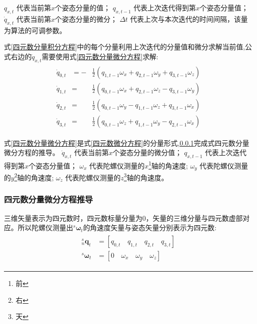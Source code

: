 $q_{x,t}$       代表当前第$x$个姿态分量的值；
$q_{x,t-1}$     代表上次迭代得到第$x$个姿态分量值；
$\dot{q}_{x,t}$ 代表当前第$x$个姿态分量的微分；
$\Delta t$      代表上次与本次迭代的时间间隔，该量为算法的可调参数。

式\ref{四元数分量积分方程}中的每个分量利用上次迭代的分量值和微分求解当前值,公式右边的$\dot{q}_{x,t}$需要使用式\ref{四元数分量微分方程}求解:
\begin{eqnarray}\label{四元数分量微分方程}
    \begin{split}
        \dot{q}_{0,t}&=- &\frac{1}{2}(q_{1,t-1}\omega_x+q_{2,t-1}\omega_y+q_{3,t-1}\omega_z) \\
        \dot{q}_{1,t}&=  &\frac{1}{2}(q_{0,t-1}\omega_x+q_{2,t-1}\omega_z-q_{3,t-1}\omega_y) \\
        \dot{q}_{2,t}&=  &\frac{1}{2}(q_{0,t-1}\omega_y-q_{1,t-1}\omega_z+q_{3,t-1}\omega_x) \\
        \dot{q}_{3,t}&=  &\frac{1}{2}(q_{0,t-1}\omega_z+q_{1,t-1}\omega_y-q_{2,t-1}\omega_x)
    \end{split}
\end{eqnarray} 

式\ref{四元数分量微分方程}是式\ref{四元数微分方程}的分量形式,\ref{section:四元数分量微分方程推导}完成式四元数分量微分方程的推导。
$\dot{q}_{x,t}$ 代表当前第$x$个姿态分量的微分值； 
$q_{x,t-1}$     代表上次迭代得到第$x$个姿态分量值；
$\omega_x$      代表陀螺仪测量的$x$\footnote{前}轴的角速度;
$\omega_y$      代表陀螺仪测量的$y$\footnote{右}轴的角速度;
$\omega_z$      代表陀螺仪测量的$z$\footnote{天}轴的角速度。

\subsubsection{四元数分量微分方程推导}\label{section:四元数分量微分方程推导}
三维矢量表示为四元数时，四元数标量分量为0，矢量的三维分量与四元数虚部对应。所以陀螺仪测量出$^s\bm{\omega}_t$的角速度矢量与姿态矢量分别表示为四元数:
\begin{eqnarray}\label{四元数分量方程}
    \begin{split}
        ^s_n\bm{q}_t&=[q_{0,t}\quad q_{1,t}\quad q_{2,t}\quad q_{3,t}] \\
        ^s\bm{\omega}_t&=[0\quad \omega_x\quad \omega_y\quad \omega_z]
    \end{split}
\end{eqnarray} 


